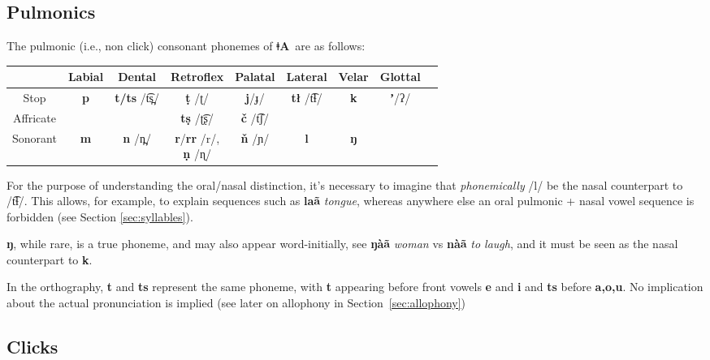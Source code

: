 \documentclass[11pt]{book}
\newcommand{\qcn}[1]{\textbf{#1}}
\newcommand{\langname}{\qcn{ǂA}~}
\newcommand{\transl}[2]{\qcn{#1} \emph{#2}}
\begin{document}
\subsection{Pulmonics}

The pulmonic (i.e., non click) consonant phonemes of \langname are as follows:

\renewcommand{\arraystretch}{2}


\begin{center}
\begin{tabular}{|c|c|c|c|c|c|c|c|c|}
\hline 
 & Labial & Dental & Retroflex & Palatal & Lateral & Velar & Glottal\\ \hline \hline
Stop & \qcn{p} & \multirow{2}{*}{\qcn{t/ts} /t͡s̪/}  & \qcn{ṭ} /ʈ/ & 	\qcn{j}/ɟ/ & \multirow{2}{*}{\qcn{tł} /t͡ɬ/}	 	&	\multirow{2}{*}{\qcn{k}} &  	\qcn{ʼ}/ʔ/ \\ \cline{1-2} \cline{4-5} \cline{8-8}
Affricate &  &  & \qcn{tṣ} /ʈ͡ʂ/ & 	\qcn{č} /t͡ʃ/ & 	&  &  	 \\ \hline
Sonorant & \qcn{m} &  \qcn{n} /n̪/ &\makecell{\qcn{r}/\qcn{rr} /r/,\\ \qcn{ṇ} /ɳ/} & \qcn{ň} /ɲ/ & \qcn{l} & \qcn{ŋ} & \\\hline
\end{tabular}
\end{center}

For the purpose of understanding the oral/nasal distinction, it's necessary to imagine that \emph{phonemically} /l/ be the nasal counterpart to /t͡ɬ/. This allows, for example, to explain sequences such as \transl{laã}{tongue}, whereas anywhere else an oral pulmonic + nasal vowel sequence is forbidden (see Section \ref{sec:syllables}).

\qcn{ŋ}, while rare, is a true phoneme, and may also appear word-initially, see \transl{ŋàã}{woman} vs \transl{nàã}{to laugh}, and it must be seen as the nasal counterpart to \qcn{k}.

In the orthography, \qcn{t} and \qcn{ts} represent the same phoneme, with \qcn{t} appearing before front vowels \qcn{e} and \qcn{i} and \qcn{ts} before \qcn{a,o,u}. No implication about the actual pronunciation is implied (see later on allophony in Section~\ref{sec:allophony})

\subsection{Clicks}
\end{document}
